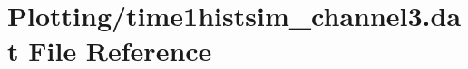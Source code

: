 \hypertarget{Plotting_2time1histsim__channel3_8dat}{}\section{Plotting/time1histsim\+\_\+channel3.dat File Reference}
\label{Plotting_2time1histsim__channel3_8dat}
